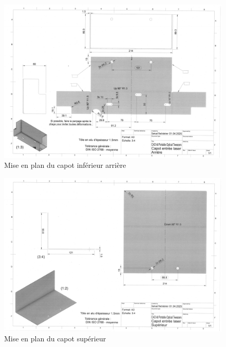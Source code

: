 \begin{figure}[H]
    \centering
    \includegraphics[angle=90,width=\textwidth]{assets/figures/Annexes/Mises_en_plan/mise_en_plan_arriere.png}
    \caption{Mise en plan du capot inférieur arrière}
    \label{mise_en_plan_capot_arriere}
\end{figure}

\begin{figure}[H]
    \centering
    \includegraphics[angle=90,width=\textwidth]{assets/figures/Annexes/Mises_en_plan/mise_en_plan_superieur.png}
    \caption{Mise en plan du capot supérieur}
    \label{mise_en_plan_capot_superieur}
\end{figure}